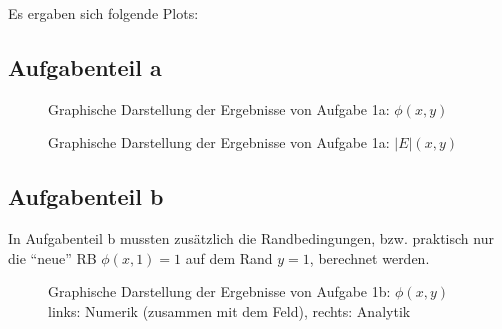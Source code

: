 Es ergaben sich folgende Plots:

\subsection*{Aufgabenteil a}

\begin{landscape}
	\begin{figure}
		\caption{Graphische Darstellung der Ergebnisse von Aufgabe 1a: $\phi(x,y)$}
		\label{fig:aPhi}
	\end{figure}
\end{landscape}

\begin{landscape}
	\begin{figure}
		\caption{Graphische Darstellung der Ergebnisse von Aufgabe 1a: $|E|(x,y)$}
		\label{fig:aabsE}
	\end{figure}
\end{landscape}


\subsection*{Aufgabenteil b}
In Aufgabenteil b mussten zusätzlich die Randbedingungen, bzw. praktisch nur die \enquote{neue} RB
$\phi(x,1)=1$ auf dem Rand $y=1$, berechnet werden.

\begin{landscape}
	\begin{figure}
		\caption{Graphische Darstellung der Ergebnisse von Aufgabe 1b: $\phi(x,y)$\\links: Numerik
        (zusammen mit dem Feld), rechts: Analytik}
		\label{fig:bPhi}
	\end{figure}
\end{landscape}

